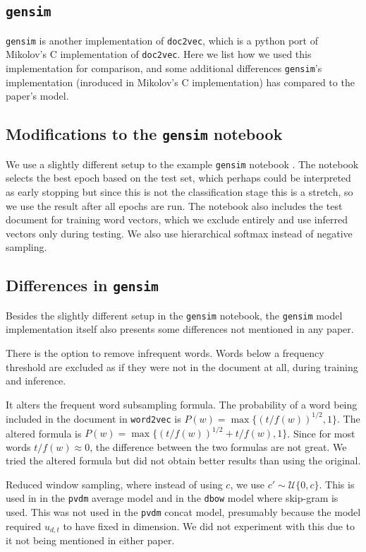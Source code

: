 \documentclass{article}
\begin{document}
\begin{appendices}
\section{\texttt{gensim}} \label{sec:gensim}
\texttt{gensim} is another implementation of \texttt{doc2vec}, which is a python port of Mikolov's C implementation of \texttt{doc2vec}. Here we list how we used this implementation for comparison, and some additional differences \texttt{gensim}'s implementation (inroduced in Mikolov's C implementation) has compared to the paper's model.

\subsection{Modifications to the \texttt{gensim} notebook}
We use a slightly different setup to the example \texttt{gensim} notebook \citep{mohr_gensim_2017}. The notebook selects the best epoch based on the test set, which perhaps could be interpreted as early stopping but since this is not the classification stage this is a stretch, so we use the result after all epochs are run. The notebook also includes the test document for training word vectors, which we exclude entirely and use inferred vectors only during testing. We also use hierarchical softmax instead of negative sampling.

\subsection{Differences in \texttt{gensim}}
Besides the slightly different setup in the \texttt{gensim} notebook, the \texttt{gensim} model implementation itself also presents some differences not mentioned in any paper.

There is the option to remove infrequent words. Words below a frequency threshold are excluded as if they were not in the document at all, during training and inference.

It alters the frequent word subsampling formula. The probability of a word being included in the document in \texttt{word2vec} is $P(w)=\max\{(t/f(w))^{1/2}, 1\}$. The altered formula is $P(w)=\max\{(t/f(w))^{1/2} + {t/f(w)}, 1\}$. Since for most words $t/f(w)\approx 0$, the difference between the two formulas are not great. We tried the altered formula but did not obtain better results than using the original.

Reduced window sampling, where instead of using $c$, we use $c'\sim\mathcal{U}\{0,c\}$. This is used in in the \texttt{pvdm} average model and in the \texttt{dbow} model where skip-gram is used. This was not used in the \texttt{pvdm} concat model, presumably because the model required $u_{d,t}$ to have fixed in dimension. We did not experiment with this due to it not being mentioned in either paper.


\end{appendices}
\end{document}
